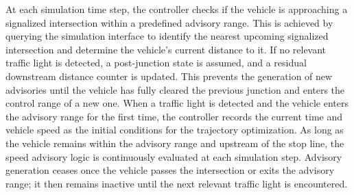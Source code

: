 At each simulation time step, the controller checks if the vehicle is approaching a signalized intersection within a predefined advisory range. This is achieved by querying the simulation interface to identify the nearest upcoming signalized intersection and determine the vehicle’s current distance to it. If no relevant traffic light is detected, a post-junction state is assumed, and a residual downstream distance counter is updated. This prevents the generation of new advisories until the vehicle has fully cleared the previous junction and enters the control range of a new one. 
\mynewline
When a traffic light is detected and the vehicle enters the advisory range for the first time, the controller records the current time and vehicle speed as the initial conditions for the trajectory optimization. As long as the vehicle remains within the advisory range and upstream of the stop line, the speed advisory logic is continuously evaluated at each simulation step. Advisory generation ceases once the vehicle passes the intersection or exits the advisory range; it then remains inactive until the next relevant traffic light is encountered.


